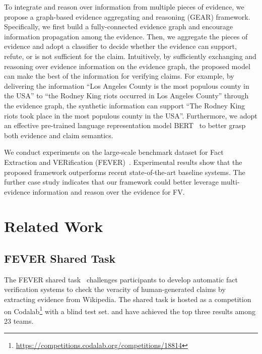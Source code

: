 \documentclass[11pt,a4paper]{article}
\begin{document}
To integrate and reason over information from multiple pieces of evidence, we propose a graph-based evidence aggregating and reasoning (GEAR) framework.
Specifically, we first build a fully-connected evidence graph and encourage information propagation among the evidence. Then, we aggregate the pieces of evidence and adopt a classifier to decide whether the evidence can support, refute, or is not sufficient for the claim.
Intuitively, by sufficiently exchanging and reasoning over evidence information on the evidence graph, the proposed model can make the best of the information for verifying claims. For example, by delivering the information ``Los Angeles County is the most populous county in the USA'' to ``the Rodney King riots occurred in Los Angeles County'' through the evidence graph, the synthetic information can support ``The Rodney King riots took place in the most populous county in the USA''. Furthermore, we adopt an effective pre-trained language representation model BERT~\cite{devlin2018bert} to better grasp both evidence and claim semantics.

We conduct experiments on the large-scale benchmark dataset for Fact Extraction and VERification (FEVER)~\cite{thorne2018fever}. Experimental results show that the proposed framework outperforms recent state-of-the-art baseline systems. The further case study indicates that our framework could better leverage multi-evidence information and reason over the evidence for FV. 

\section{Related Work}
\subsection{FEVER Shared Task}
The FEVER shared task~\cite{thorne18fact} challenges participants to develop automatic fact verification systems to check the veracity of human-generated claims by extracting evidence from Wikipedia. The shared task is hosted as a competition on Codalab\footnote{\url{https://competitions.codalab.org/competitions/18814}} with a blind test set.  and   have achieved the top three results among 23 teams.
\end{document}
